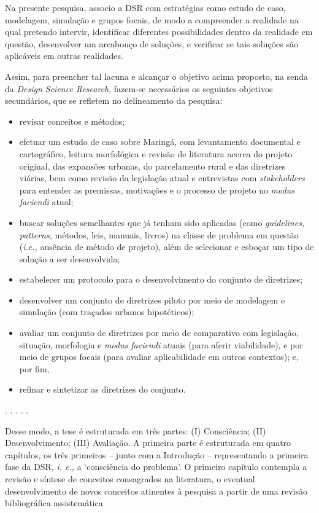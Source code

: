 \documentclass[]{report}
\begin{document}
	Na presente pesquisa, associo a DSR com estratégias como estudo de caso, modelagem, simulação e grupos focais, de modo a compreender a realidade na qual pretendo intervir, identificar diferentes possibilidades dentro da realidade em questão, desenvolver um arcabouço de soluções, e verificar se tais soluções são aplicáveis em outras realidades.

	Assim, para preencher tal lacuna e alcançar o objetivo acima proposto, na senda da \textit{Design Science Research}, fazem-se necessários os seguintes objetivos secundários, que se refletem no delineamento da pesquisa: 
	\begin{itemize}
		\item revisar conceitos e métodos; 
		\item efetuar um estudo de caso sobre Maringá, com levantamento documental e cartográfico, leitura morfológica e revisão de literatura acerca do projeto original, das expansões urbanas, do parcelamento rural e das diretrizes viárias, bem como revisão da legislação atual e entrevistas com \textit{stakeholders} para entender as premissas, motivações e o processo de projeto no \textit{modus faciendi} atual; 
		\item buscar soluções semelhantes que já tenham sido aplicadas (como \textit{guidelines, patterns,} métodos, leis, manuais, livros) na classe de problema em questão (\textit{i.e.,} ausência de método de projeto), além de selecionar e esboçar um tipo de solução a ser desenvolvida;
		\item estabelecer um protocolo para o desenvolvimento do conjunto de diretrizes; 
		\item desenvolver um conjunto de diretrizes piloto por meio de modelagem e simulação (com traçados urbanos hipotéticos); 
		\item avaliar um conjunto de diretrizes por meio de comparativo com legislação, situação, morfologia e \textit{modus faciendi} atuais (para aferir viabilidade), e por meio de grupos focais (para avaliar aplicabilidade em outros contextos); e, por fim, 
		\item refinar e sintetizar as diretrizes do conjunto.
	\end{itemize}

	\begin{center}
		. . . . .
	\end{center}

	Desse modo, a tese é estruturada em três partes: (I) Consciência; (II) Desenvolvimento; (III) Avaliação. A primeira parte é estruturada em quatro capítulos, os três primeiros – junto com a Introdução – representando a primeira fase da DSR, \textit{i. e.,} a `consciência do problema'. O primeiro capítulo contempla a revisão e síntese de conceitos consagrados na literatura, o eventual desenvolvimento de novos conceitos atinentes à pesquisa a partir de uma revisão bibliográfica assistemática
\end{document}
